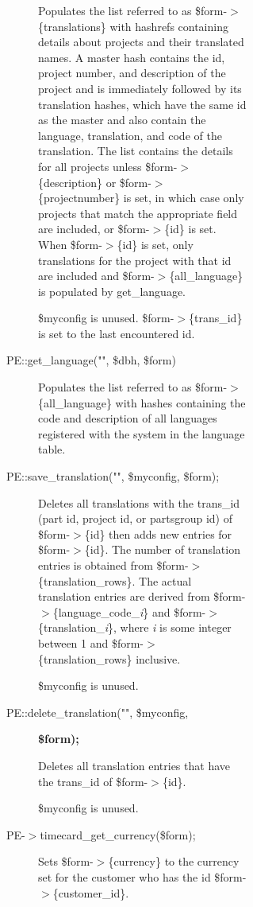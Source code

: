 \begin{description}
\begin{description}
\begin{description}
\begin{description}
\begin{description}
\begin{description}
Populates the list referred to as \$form-$>$\{translations\} with hashrefs containing
details about projects and their translated names.  A master hash contains the
id, project number, and description of the project and is immediately followed
by its translation hashes, which have the same id as the master and also
contain the language, translation, and code of the translation.  The list
contains the details for all projects unless \$form-$>$\{description\} or 
\$form-$>$\{projectnumber\} is set, in which case only projects that match the
appropriate field are included, or \$form-$>$\{id\} is set.  When \$form-$>$\{id\} is
set, only translations for the project with that id are included and
\$form-$>$\{all\_language\} is populated by get\_language.



\$myconfig is unused.  \$form-$>$\{trans\_id\} is set to the last encountered id.


\item[{PE::get\_language("", \$dbh, \$form)}] \mbox{}

Populates the list referred to as \$form-$>$\{all\_language\} with hashes containing
the code and description of all languages registered with the system in the
language table.


\item[{PE::save\_translation("", \$myconfig, \$form);}] \mbox{}

Deletes all translations with the trans\_id (part id, project id, or partsgroup
id) of \$form-$>$\{id\} then adds new entries for \$form-$>$\{id\}.  The number of
translation entries is obtained from \$form-$>$\{translation\_rows\}.  The actual
translation entries are derived from \$form-$>$\{language\_code\_\textit{i}\} and
\$form-$>$\{translation\_\textit{i}\}, where \textit{i} is some integer between 1 and
\$form-$>$\{translation\_rows\} inclusive.



\$myconfig is unused.


\item[{PE::delete\_translation("", \$myconfig,}] \textbf{\$form);}

Deletes all translation entries that have the trans\_id of \$form-$>$\{id\}.



\$myconfig is unused.


\item[{PE-$>$timecard\_get\_currency(\$form);}] \mbox{}

Sets \$form-$>$\{currency\} to the currency set for the customer who has the id
\$form-$>$\{customer\_id\}.



\end{description}
\end{description}
\end{description}
\end{description}
\end{description}
\end{description}
